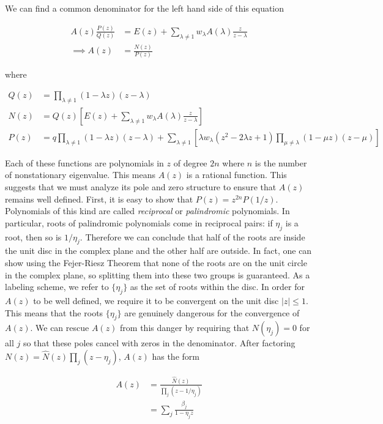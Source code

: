 \documentclass{article}
\begin{document}
We can find a common denominator for the left hand side of this equation 

\begin{align}
    A(z) \frac{P(z)}{Q(z)} &= E(z) + \sum_{\lambda\neq 1}w_\lambda A(\lambda)\frac{z}{z-\lambda}\\
    \implies A(z) &= \frac{N(z)}{P(z)} \label{Arational}
\end{align}

where 

\begin{align}
    Q(z) &= \prod_{\lambda\neq 1}(1-\lambda z)(z - \lambda) \\
    N(z) &= Q(z)\left[E(z) + \sum_{\lambda\neq 1}w_\lambda A(\lambda)\frac{z}{z-\lambda} \right]\\
    P(z) &= q  \prod_{\lambda\neq 1}(1-\lambda z)(z - \lambda) + \sum_{\lambda\neq 1}\left[\lambda w_\lambda (z^2 -2 \lambda z + 1)\prod_{\mu \neq \lambda}(1-\mu z)(z - \mu)\right]
\end{align}

Each of these functions are polynomials in $z$ of degree $2n$ where $n$ is the number of nonstationary eigenvalue. This means $A(z)$ is a rational function. This suggests that we must analyze its pole and zero structure to ensure that $A(z)$ remains well defined. First, it is easy to show that $P(z) = z^{2n}P(1/z)$. Polynomials of this kind are called \textit{reciprocal} or \textit{palindromic} polynomials. In particular, roots of palindromic polynomials come in reciprocal pairs: if $\eta_j$ is a root, then so is $1/\eta_j$. Therefore we can conclude that half of the roots are inside the unit disc in the complex plane and the other half are outside. In fact, one can show using the Fejer-Riesz Theorem that none of the roots are on the unit circle in the complex plane, so splitting them into these two groups is guaranteed. As a labeling scheme, we refer to $\{\eta_j\}$ as the set of roots within the disc. In order for $A(z)$ to be well defined, we require it to be convergent on the unit disc $|z| \le 1$. This means that the roots $\{\eta_j\}$ are genuinely dangerous for the convergence of $A(z)$. We can rescue $A(z)$ from this danger by requiring that $N(\eta_j) = 0$ for all $j$ so that these poles cancel with zeros in the denominator. After factoring $N(z) = \hat{N}(z)\prod_{j} (z - \eta_j)$, $A(z)$ has the form

\begin{align}
    A(z) &= \frac{\hat{N}(z)}{\prod_j (z - 1/\eta_j)} \\
    &= \sum_j \frac{\beta_j}{1-\eta_j z}
\end{align}
\end{document}
